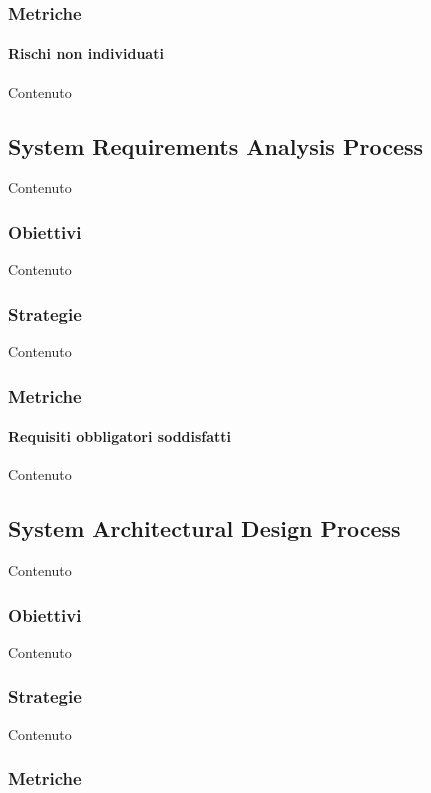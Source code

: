     \subsubsection{Metriche}

    \paragraph{Rischi non individuati}
    Contenuto


    \subsection{System Requirements Analysis Process}
    Contenuto

    \subsubsection{Obiettivi}
    Contenuto

    \subsubsection{Strategie}
    Contenuto


    \subsubsection{Metriche}
    
    \paragraph{Requisiti obbligatori soddisfatti}
    Contenuto


    \subsection{System Architectural Design Process}
    Contenuto

    \subsubsection{Obiettivi}
    Contenuto

    \subsubsection{Strategie}
    Contenuto


    \subsubsection{Metriche}

